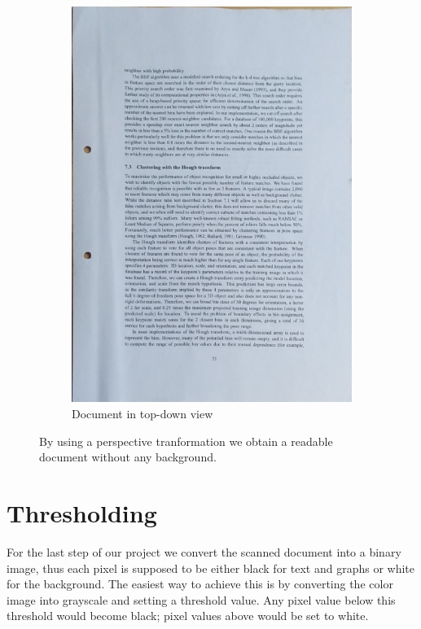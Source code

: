 \documentclass[bibliography=totoc]{scrartcl}
\begin{document}
\begin{figure}[ht!]
\begin{subfigure}[t]{0.3\linewidth}
		\includegraphics[width=\linewidth]{imgs/topdown/extreme_angle.jpg}
		\caption{Document in top-down view}
		\label{subfig:perspective_tranform}
	\end{subfigure}
	\caption{By using a perspective tranformation we obtain a readable document without any background.}
\end{figure}

\section{Thresholding}
For the last step of our project we convert the scanned document into a binary image, thus each pixel is supposed to be either black for text and graphs or white for the background.
The easiest way to achieve this is by converting the color image into grayscale and setting a threshold value.
Any pixel value below this threshold would become black; pixel values above would be set to white.
\end{document}
